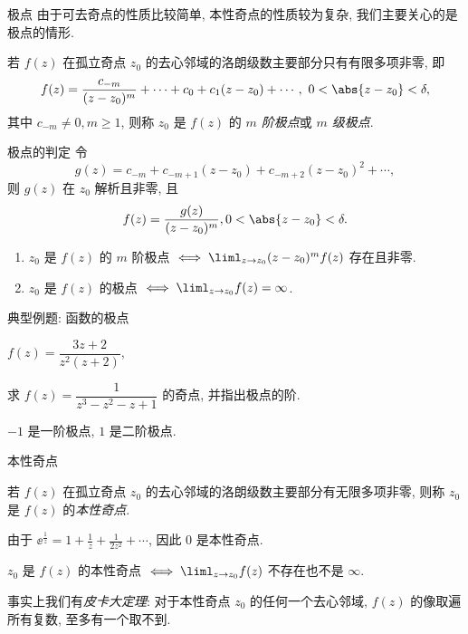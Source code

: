 \begin{frame}{极点}
	\onslide<+->
	由于可去奇点的性质比较简单, 本性奇点的性质较为复杂, 我们主要关心的是极点的情形.
	\onslide<+->
	\begin{definition}
		若 $f(z)$ 在孤立奇点 $z_0$ 的去心邻域的洛朗级数主要部分只有有限多项非零, 即
		\[
			f(z)=\frac{c_{-m}}{(z-z_0)^m}+\cdots+c_0+c_1(z-z_0)+\cdots,\ 0<\abs{z-z_0}<\delta,
		\]
		其中 $c_{-m}\neq 0,m\ge 1$, 则称 $z_0$ 是 $f(z)$ 的 \emph{$m$ 阶极点}或 \emph{$m$ 级极点}.
	\end{definition}
\end{frame}


\begin{frame}{极点的判定}
	\onslide<+->
	令
	\[
		g(z)=c_{-m}+c_{-m+1}(z-z_0)+c_{-m+2}(z-z_0)^2+\cdots,
	\]
	则 $g(z)$ 在 $z_0$ 解析且非零,
	\onslide<+->
	且
	\[
		f(z)=\dfrac{g(z)}{(z-z_0)^m},0<\abs{z-z_0}<\delta.
	\]
	\onslide<+->
	\begin{theorem}
		\begin{enumerate}
			\item $z_0$ 是 $f(z)$ 的 $m$ 阶极点 $\iff\liml_{z\to z_0}(z-z_0)^mf(z)$ 存在且非零.
			\item $z_0$ 是 $f(z)$ 的极点 $\iff\liml_{z\to z_0}f(z)=\infty$.
		\end{enumerate}
	\end{theorem}
\end{frame}


\begin{frame}{典型例题: 函数的极点}
	\onslide<+->
	\begin{example}
		$f(z)=\dfrac{3z+2}{z^2(z+2)}$,
		\onslide<+->{%
			同理 $-2$ 是一阶极点.
		}
	\end{example}
	\onslide<+->
	\begin{exercise}[nearnext]
		求 $f(z)=\dfrac1{z^3-z^2-z+1}$ 的奇点, 并指出极点的阶.
	\end{exercise}
	\onslide<+->
	\begin{answer}[nearprev]
		$-1$ 是一阶极点, $1$ 是二阶极点.
	\end{answer}
\end{frame}


\begin{frame}{本性奇点}
	\onslide<+->
	\begin{definition}
		若 $f(z)$ 在孤立奇点 $z_0$ 的去心邻域的洛朗级数主要部分有无限多项非零, 则称 $z_0$ 是 $f(z)$ 的\emph{本性奇点}.
	\end{definition}
	\onslide<+->
	\begin{example}
		由于 $\displaystyle \ee^{\frac1z}=1+\frac1z+\frac1{2z^2}+\cdots$, 因此 $0$ 是本性奇点.
	\end{example}
	\onslide<+->
	\begin{theorem}
		$z_0$ 是 $f(z)$ 的本性奇点 $\iff\liml_{z\to z_0}f(z)$ 不存在也不是 $\infty$.
	\end{theorem}
	\onslide<+->
	事实上我们有\emph{皮卡大定理}: 对于本性奇点 $z_0$ 的任何一个去心邻域, $f(z)$ 的像取遍所有复数, 至多有一个取不到.
\end{frame}


